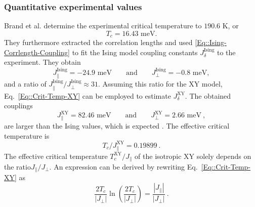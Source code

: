 	\subsubsection{Quantitative experimental values}
	Brand et al. determine the experimental critical temperature to $190.6 \text{ K}$, or  
	\begin{equation} \label{Eq::Exp-Tc}
		T_c =	16.43 \text{ meV.}
	\end{equation} 
	They furthermore extracted the correlation lengths and used \eqref{Eq::Ising-Corrlength-Coupling} to fit the Ising model coupling constants $J_\delta^{\text{Ising}}$ to the experiment. They obtain
	\begin{equation} \label{Eq::Exp-coupling-ising}
		J_\parallel^{\text{Ising}} =	-24.9 \text{ meV} 	\qquad \text{and} \qquad 	J_\perp^{\text{Ising}} =	-0.8 \text{ meV},
	\end{equation}
	and a ratio of $J_\parallel^{\text{Ising}} /	J_\perp^{\text{Ising}} \approx	31$.
	 Assuming this ratio for the XY model, Eq.~\eqref{Eq::Crit-Temp-XY} can be employed to estimate $J_\delta^{\text{XY}}$. The obtained couplings
	\begin{equation}
		J_\parallel^{\text{XY}} = 82.46 \text{ meV}\qquad \text{and} \qquad J_\perp^\text{XY} =	2.66 \text{ meV} ~,
	\end{equation}
	are larger than the Ising values, which is expected \cite{aizenman1980comparison}. %
	The effective critical temperature is
	\begin{equation} \label{Eq::Tc-XY-31}
		T_c /	J_\parallel^{\text{XY}} =	0.19899~.
	\end{equation}
	The effective critical temperature $T_c^{\text{XY}} /	J_\parallel$ of the isotropic XY solely depends on the ratio$J_\parallel /	J_\perp$. An expression can be derived by rewriting Eq.~\eqref{Eq::Crit-Temp-XY} as
	\begin{equation}
		\frac{2 T_c}{|J_\perp|} \ln \left(\frac{2 T_c}{ |J_\perp|}\right) =	\frac{|J_\parallel|}{|J_\perp|}~.
	\end{equation}
